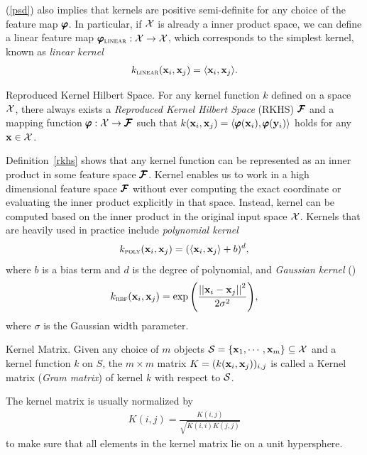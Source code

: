 {(\ref{psd}) also implies that kernels are positive semi-definite for any choice of the feature map $\pmb \varphi$.
In particular, if $\mathcal{X}$ is already a inner product space, we can define a linear feature map $\pmb \varphi_{\text{\sc linear}}:\mathcal{X}\rightarrow\mathcal{X}$, which corresponds to the simplest kernel, known as \textit{linear kernel}
\begin{align*}
	k_{\text{\sc linear}}(\mathbf {x}_i,\mathbf {x}_j) = \langle \mathbf {x}_i, \mathbf {x}_j \rangle.
\end{align*}
\begin{definition}{Reproduced Kernel Hilbert Space.} \label{rkhs}
	For any kernel function $k$ defined on a space $\mathcal{X}$, there always exists a \textit{Reproduced Kernel Hilbert Space} (RKHS) $\pmb {\mathcal{F}}$ and a mapping function $\pmb \varphi:\mathcal{X}\rightarrow\pmb {\mathcal{F}}$ such that $k(\mathbf {x}_i,\mathbf {x}_j)=\langle \pmb \varphi(\mathbf {x}_i), \pmb \varphi(\mathbf {y}_i) \rangle$ holds for any $\mathbf {x}\in\mathcal{X}$.
\end{definition}
\noindent
Definition~\ref{rkhs} shows that any kernel function can be represented as an inner product in some feature space $\pmb {\mathcal{F}}$.
Kernel enables us to work in a high dimensional feature space $\pmb {\mathcal{F}}$ without ever computing the exact coordinate or evaluating the inner product explicitly in that space.
Instead, kernel can be computed based on the inner product in the original input space $\mathcal{X}$.
Kernels that are heavily used in practice include
\textit{polynomial kernel}
\begin{align*}
	k_{\textit{\sc{poly}}}(\mathbf {x}_i,\mathbf {x}_j) = (\langle \mathbf {x}_i, \mathbf {x}_j \rangle + b)^d,
\end{align*}
where $b$ is a bias term and $d$ is the degree of polynomial, and \textit{Gaussian kernel} (\rbf)
\begin{align*}
	k_{\text{{\sc rbf}}}(\mathbf {x}_i,\mathbf {x}_j) = \exp{\left(\frac{\left|\left| {\mathbf {x}_i}-{\mathbf {x}_j} \right|\right|^2}{2\sigma^2}\right)},
\end{align*}
where $\sigma$ is the Gaussian width parameter.
\begin{definition}{Kernel Matrix.}
	Given any choice of $m$ objects $\mathcal{S}=\{\mathbf {x}_1,\cdots,\mathbf {x}_m\}\subseteq\mathcal{X}$ and a kernel function $k$ on $S$, the $m\times m$ matrix $K=(k(\mathbf {x}_i,\mathbf {x}_j))_{i,j}$ is called a Kernel matrix (\textit{Gram matrix}) of kernel $k$ with respect to $\mathcal{S}$.
\end{definition}
\noindent
The kernel matrix is usually normalized by
\begin{align*}
	{K}(i,j) = \frac{{K}(i,j)}{\sqrt{{K}(i,i){K}(j,j)}}
\end{align*}
to make sure that all elements in the kernel matrix lie on a unit hypersphere.
}
